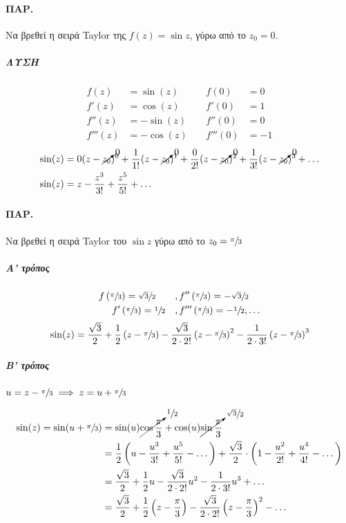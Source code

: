 \documentclass[12pt,a4paper,notitlepage,fleqn]{article}
\begin{document}
  \paragraph{ΠΑΡ.}
  Να βρεθεί η σειρά Taylor της \( f(z) = \sin z \), γύρω από το \( z_0 = 0 \).
  \subparagraph{ΛΥΣΗ}
  \[
  \begin{array}{rlrl}
  f(z) &= \sin(z)  \qquad & f(0)&=0                    \\
  f'(z) &= \cos(z) & f'(0) &= 1                     \\
  f''(z) &= -\sin(z) & f''(0) &= 0                  \\
  f'''(z) &= -\cos(z) & f'''(0) &= -1
  \end{array}
  \]
  \begin{align*}
  \sin(z) &= 0(z-\cancelto{0}{z_0})^0 + \frac{1}{1!}(z-\cancelto{0}{z_0})^1
  + \frac{0}{2!}(z-\cancelto{0}{z_0})^2 + \frac{1}{3!}(z-\cancelto{0}{z_0})^3+\dots
  \\ \sin(z) &= z - \frac{z^3}{3!} + \frac{z^5}{5!} + \dots
  \end{align*}

  \paragraph{ΠΑΡ.}
  Να βρεθεί η σειρά Taylor του \( \sin z \) γύρω από το \( z_0 = \sfrac{\pi}{3} \)
  \subparagraph{Α' τρόπος}
  \begin{align*}
  f\left(\sfrac{\pi}{3} \right) = \sfrac{\sqrt{3}}{2} \qquad &,
  f''\left(\sfrac{\pi}{3} \right) = -\sfrac{\sqrt{3}}{2} \\
  f'\left(\sfrac{\pi}{3} \right) = \sfrac{1}{2} \quad &,
  f'''\left(\sfrac{\pi}{3} \right) = -\sfrac{1}{2},\dots\end{align*}\[
  \\ \sin(z)=\frac{\sqrt{3}}{2}+\frac{1}{2}\left(z-\sfrac{\pi}{3} \right)
  -\frac{\sqrt{3}}{2\cdot 2!} \left(z-\sfrac{\pi}{3} \right)^2
  -\frac{1}{2\cdot 3!}\left( z-\sfrac{\pi}{3}  \right)^3
  \]
  \subparagraph{Β' τρόπος}
  \( u = z-\sfrac{\pi}{3} \implies z=u+\sfrac{\pi}{3}   \)

  \begin{align*}
  \sin(z) = \sin(u+\sfrac{\pi}{3} ) &=
  \sin(u) \cancelto{\sfrac{1}{2} }{\cos\frac{\pi}{3}}
  +\cos(u) \cancelto{\sfrac{\sqrt{3}}{2} }{\sin\frac{\pi}{3}}
  \\ &= \frac{1}{2}\left(
  u-\frac{u^3}{3!} +\frac{u^5}{5!} -\dots
  \right) + \frac{\sqrt{3}}{2} \cdot \left(
  1-\frac{u^2}{2!} + \frac{u^4}{4!} - \dots
  \right)
  \\ &= \frac{\sqrt{3}}{2} + \frac{1}{2}u-\frac{\sqrt{3}}{2\cdot 2!}u^2
  -\frac{1}{2\cdot 3!}u^3+\dots
  \\ &= \frac{\sqrt{3}}{2}+\frac{1}{2}\left( z-\frac{\pi}{3} \right)
  -\frac{\sqrt{3}}{2\cdot 2!} \left( z-\frac{\pi}{3} \right)^2 - \dots
  \end{align*}
\end{document}

